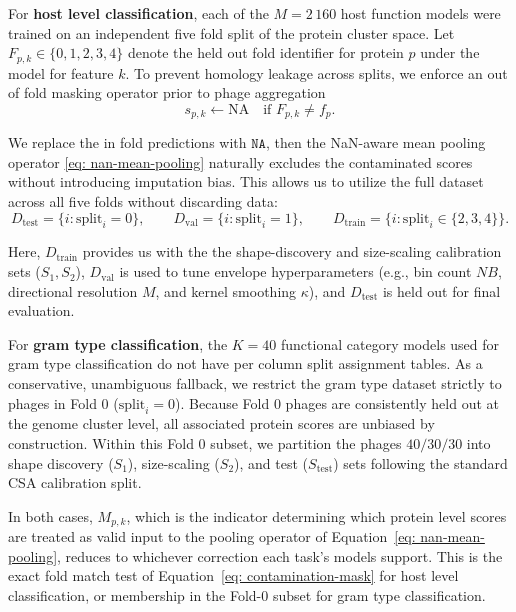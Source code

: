 For \textbf{host level classification}, each of the $M = 2\,160$ host function models were trained on an independent 
five fold split of the protein cluster space. Let $F_{p,k} \in \{0, 1, 2, 3, 4\}$ denote the held out fold identifier 
for protein $p$ under the model for feature $k$. To prevent homology leakage across splits, we enforce an out of fold 
masking operator prior to phage aggregation
\begin{equation}
\label{eq: contamination-mask}
s_{p,k} \leftarrow \text{NA} \quad \text{if } F_{p,k} \neq f_p.
\end{equation}

We replace the in fold predictions with $\texttt{NA}$, then the NaN-aware mean pooling operator \eqref{eq: nan-mean-pooling} 
naturally excludes the contaminated scores without introducing imputation bias. This allows us to utilize the full  dataset across 
all five folds without discarding data:
\begin{equation*}
D_{\text{test}} = \{i : \text{split}_i = 0\}, \qquad D_{\text{val}} = \{i : \text{split}_i = 1\}, \qquad D_{\text{train}} = 
\{i : \text{split}_i \in \{2,3,4\}\}.
\end{equation*}

Here, $D_{\text{train}}$ provides us with the the shape-discovery and size-scaling calibration sets ($S_1, S_2$), 
$D_{\text{val}}$ is used to tune envelope hyperparameters (e.g., bin count $NB$, directional resolution $M$, and kernel smoothing 
$\kappa$), and $D_{\text{test}}$ is held out for final evaluation.

\newpage
For \textbf{gram type classification}, the $K = 40$ functional category models used for gram type classification do not 
have per column split assignment tables. As a conservative, unambiguous fallback, we restrict the gram type dataset strictly to 
phages in Fold 0 ($\text{split}_i = 0$). Because Fold 0 phages are consistently held out at the genome cluster level, all 
associated protein scores are unbiased by construction. Within this Fold 0 subset, we partition the phages $40/30/30$ into shape 
discovery ($S_1$), size-scaling ($S_2$), and test ($S_{\text{test}}$) sets following the standard CSA calibration split.

In both cases, $M_{p,k}$, which is the indicator determining which protein level scores are treated as valid input 
to the pooling operator of Equation~\eqref{eq: nan-mean-pooling}, reduces to whichever correction each task's models 
support. This is the exact fold match test of Equation~\eqref{eq: contamination-mask} for host level classification, or 
membership in the Fold-$0$ subset for gram type classification.


